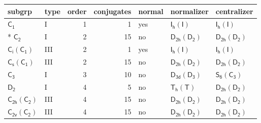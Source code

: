 \documentclass[10pt,a4paper]{article}
\numberwithin{equation}{section}
\newcommand{\grp}[1]{\mathsf{#1}}
\newcommand{\nconj}[1]{{\scriptsize$\times#1$}}
\begin{document}
\begin{center}
\end{center}
{\small\begin{longtable}{@{}llrrlll@{}}\toprule
subgrp & type & order & conjugates & normal & normalizer & centralizer\\\midrule\endhead
\bottomrule\endfoot\endlastfoot
\href{../../../rotation/data/pdf/C1.pdf}{$\grp{C_{1}}$} & I & 1 & 1 & yes & \href{Ih-I.pdf}{$\grp{I_{h}}(\grp{I})$} & \href{Ih-I.pdf}{$\grp{I_{h}}(\grp{I})$}\\*
\href{../../../rotation/data/pdf/C2.pdf}{$\grp{C_{2}}$} & I & 2 & 15 & no & \href{D2h-D2.pdf}{$\grp{D_{2h}}(\grp{D_{2}})$} & \href{D2h-D2.pdf}{$\grp{D_{2h}}(\grp{D_{2}})$}\\
\href{S2-C1.pdf}{$\grp{C_{i}}(\grp{C_{1}})$} & III & 2 & 1 & yes & \href{Ih-I.pdf}{$\grp{I_{h}}(\grp{I})$} & \href{Ih-I.pdf}{$\grp{I_{h}}(\grp{I})$}\\
\href{C1v-C1.pdf}{$\grp{C_{s}}(\grp{C_{1}})$} & III & 2 & 15 & no & \href{D2h-D2.pdf}{$\grp{D_{2h}}(\grp{D_{2}})$} & \href{D2h-D2.pdf}{$\grp{D_{2h}}(\grp{D_{2}})$}\\
\href{../../../rotation/data/pdf/C3.pdf}{$\grp{C_{3}}$} & I & 3 & 10 & no & \href{D3d-D3.pdf}{$\grp{D_{3d}}(\grp{D_{3}})$} & \href{S6-C3.pdf}{$\grp{S_{6}}(\grp{C_{3}})$}\\
\href{../../../rotation/data/pdf/D2.pdf}{$\grp{D_{2}}$} & I & 4 & 5 & no & \href{Th-T.pdf}{$\grp{T_{h}}(\grp{T})$} & \href{D2h-D2.pdf}{$\grp{D_{2h}}(\grp{D_{2}})$}\\
\href{C2h-C2.pdf}{$\grp{C_{2h}}(\grp{C_{2}})$} & III & 4 & 15 & no & \href{D2h-D2.pdf}{$\grp{D_{2h}}(\grp{D_{2}})$} & \href{D2h-D2.pdf}{$\grp{D_{2h}}(\grp{D_{2}})$}\\
\href{C2v-C2.pdf}{$\grp{C_{2v}}(\grp{C_{2}})$} & III & 4 & 15 & no & \href{D2h-D2.pdf}{$\grp{D_{2h}}(\grp{D_{2}})$} & \href{D2h-D2.pdf}{$\grp{D_{2h}}(\grp{D_{2}})$}\\

\end{longtable}}
\end{document}
